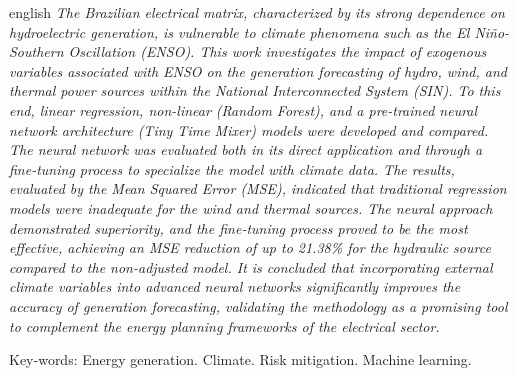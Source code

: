 \begin{resumo}[Abstract]	
\begin{otherlanguage*}{english}
\noindent 
\textit{The Brazilian electrical matrix, characterized by its strong dependence on hydroelectric generation, is vulnerable to climate 
phenomena such as the El Niño-Southern Oscillation (ENSO). This work investigates the impact of exogenous variables associated with 
ENSO on the generation forecasting of hydro, wind, and thermal power sources within the National Interconnected System (SIN). To this end, 
linear regression, non-linear (Random Forest), and a pre-trained neural network architecture (Tiny Time Mixer) models were developed and compared. 
The neural network was evaluated both in its direct application and through a fine-tuning process to specialize the model with climate data. The 
results, evaluated by the Mean Squared Error (MSE), indicated that traditional regression models were inadequate for the wind and thermal sources. 
The neural approach demonstrated superiority, and the fine-tuning process proved to be the most effective, achieving an MSE reduction of up to 
21.38\% for the hydraulic source compared to the non-adjusted model. It is concluded that incorporating external climate variables into advanced 
neural networks significantly improves the accuracy of generation forecasting, validating the methodology as a promising tool to complement the 
energy planning frameworks of the electrical sector.}

\vspace{0.2cm}
\noindent
Key-words: Energy generation. Climate. Risk mitigation. Machine learning.
\end{otherlanguage*}
\end{resumo}